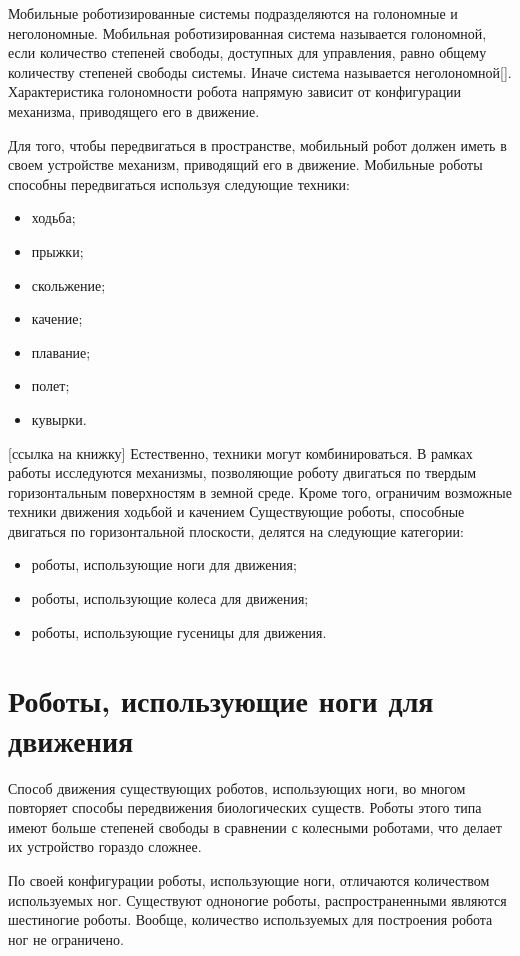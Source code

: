 \documentclass[oneside,final,14pt]{extreport}
\begin{document}
Мобильные роботизированные системы подразделяются на голономные и неголономные. Мобильная роботизированная система называется голономной, если количество степеней свободы, доступных для управления, равно общему количеству степеней свободы системы. Иначе система называется неголономной[]. Характеристика голономности робота напрямую зависит от конфигурации механизма, приводящего его в движение.
 
Для того, чтобы передвигаться в пространстве, мобильный робот должен иметь в своем устройстве механизм, приводящий его в движение. Мобильные роботы способны передвигаться используя следующие техники:
\begin{itemize}
\item ходьба;
\item прыжки;
\item скольжение;
\item качение;
\item плавание;
\item полет;
\item кувырки.
\end{itemize}
[ссылка на книжку]
Естественно, техники могут комбинироваться. 
 В рамках работы исследуются механизмы, позволяющие роботу двигаться по твердым горизонтальным поверхностям в земной среде. Кроме того, ограничим возможные техники движения ходьбой и качением Существующие роботы, способные двигаться по горизонтальной плоскости, делятся на следующие категории:
\begin{itemize}
\item роботы, использующие ноги для движения;
\item роботы, использующие колеса для движения;
\item роботы, использующие гусеницы для движения.
\end{itemize} 
\section{Роботы, использующие ноги для движения}
Способ движения существующих роботов, использующих ноги, во многом повторяет способы передвижения биологических существ. Роботы этого типа имеют больше степеней свободы в сравнении с колесными роботами, что делает их устройство гораздо сложнее.

По своей конфигурации роботы, использующие ноги, отличаются количеством используемых ног. Существуют одноногие роботы, распространенными являются шестиногие роботы. Вообще, количество используемых для построения робота ног не ограничено. 
\end{document}
